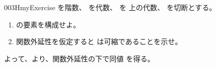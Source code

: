\documentclass[index]{subfiles}
\begin{document}
\begin{myBlock}{003H}{myExercise}
  を階数、
  を\myInlineMath{\myNat}代数、
  を
  上の\myInlineMath{\myNat}代数、
  を切断とする。
  \begin{enumerate}
  \item {}の要素を構成せよ。
  \item 関数外延性を仮定すると
    は可縮であることを示せ。
  \end{enumerate}
  よって、より、関数外延性の下で同値
  を得る。
\end{myBlock}
\end{document}
